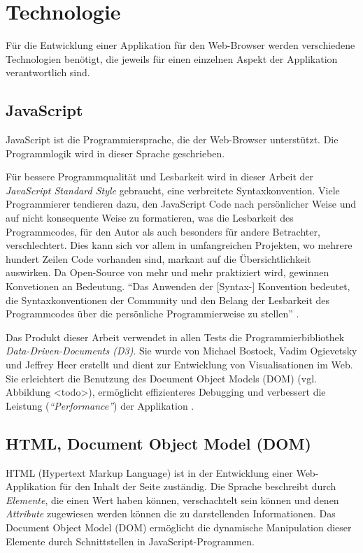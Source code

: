 \section{Technologie}

Für die Entwicklung einer Applikation für den Web-Browser werden verschiedene Technologien benötigt, die jeweils für einen einzelnen Aspekt der Applikation verantwortlich sind.

\subsection{JavaScript}

JavaScript ist die Programmiersprache, die der Web-Browser unterstützt. Die Programmlogik wird in dieser Sprache geschrieben.

Für bessere Programmqualität und Lesbarkeit wird in dieser Arbeit der \textit{JavaScript Standard Style} gebraucht, eine verbreitete Syntaxkonvention. Viele Programmierer tendieren dazu, den JavaScript Code nach persönlicher Weise und auf nicht konsequente Weise zu formatieren, was die Lesbarkeit des Programmcodes, für den Autor als auch besonders für andere Betrachter, verschlechtert. Dies kann sich vor allem in umfangreichen Projekten, wo mehrere hundert Zeilen Code vorhanden sind, markant auf die Übersichtlichkeit auswirken. Da Open-Source von mehr und mehr praktiziert wird, gewinnen Konvetionen an Bedeutung. "`Das Anwenden der [Syntax-] Konvention bedeutet, die Syntaxkonventionen der Community und den Belang der Lesbarkeit des Programmcodes über die persönliche Programmierweise zu stellen"' \cite{feross}.

Das Produkt dieser Arbeit verwendet in allen Tests die Programmierbibliothek \textit{Data-Driven-Documents (D3)}. Sie wurde von Michael Bostock, Vadim Ogievetsky und Jeffrey Heer erstellt und dient zur Entwicklung von Visualisationen im Web. Sie erleichtert die Benutzung des Document Object Models (DOM) (vgl. Abbildung <todo>), ermöglicht effizienteres Debugging und verbessert die Leistung (\textit{"`Performance"'}) der Applikation \cite{bostock}.

\subsection{HTML, Document Object Model (DOM)}

HTML (Hypertext Markup Language) ist in der Entwicklung einer Web-Applikation für den Inhalt der Seite zuständig. Die Sprache beschreibt durch \textit{Elemente}, die einen Wert haben können, verschachtelt sein können und denen \textit{Attribute} zugewiesen werden können die zu darstellenden Informationen. Das Document Object Model (DOM) ermöglicht die dynamische Manipulation dieser Elemente durch Schnittstellen in JavaScript-Programmen.


